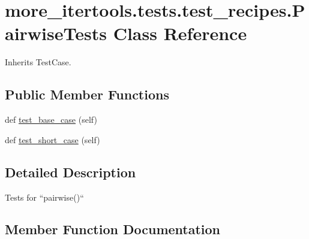 \hypertarget{classmore__itertools_1_1tests_1_1test__recipes_1_1_pairwise_tests}{}\section{more\+\_\+itertools.\+tests.\+test\+\_\+recipes.\+Pairwise\+Tests Class Reference}
\label{classmore__itertools_1_1tests_1_1test__recipes_1_1_pairwise_tests}


Inherits Test\+Case.

\subsection*{Public Member Functions}
\begin{DoxyCompactItemize}
\item 
def \hyperlink{classmore__itertools_1_1tests_1_1test__recipes_1_1_pairwise_tests_aec2e3e2eb400a49a01ff8db2beaa7407}{test\+\_\+base\+\_\+case} (self)
\item 
def \hyperlink{classmore__itertools_1_1tests_1_1test__recipes_1_1_pairwise_tests_a75c819573ac92a134ec8256961e6f667}{test\+\_\+short\+\_\+case} (self)
\end{DoxyCompactItemize}


\subsection{Detailed Description}
\begin{DoxyVerb}Tests for ``pairwise()``\end{DoxyVerb}
 

\subsection{Member Function Documentation}
\mbox{\label{classmore__itertools_1_1tests_1_1test__recipes_1_1_pairwise_tests_aec2e3e2eb400a49a01ff8db2beaa7407}} 

